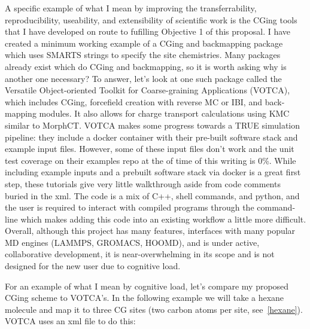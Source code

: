 A specific example of what I mean by improving the transferrability, reproducibility, useability, and extensibility of scientific work is the CGing tools that I have developed on route to fufilling Objective 1 of this proposal.
I have created a minimum working example of a CGing and backmapping package which uses SMARTS strings to specify the site chemistries\cite{grits}.
Many packages already exist which do CGing and backmapping, so it is worth asking why is another one necessary?
To answer, let's look at one such package called the Versatile Object-oriented Toolkit for Coarse-graining Applications (VOTCA)\cite{Ruhle2011b}, which includes CGing, forcefield creation with reverse MC or IBI, and back-mapping modules.
It also allows for charge transport calculations using KMC similar to MorphCT\cite{Lukyanov2010}.
VOTCA makes some progress towards a TRUE simulation pipeline: they include a docker container with their pre-built software stack and example input files.
However, some of these input files don't work and the unit test coverage on their examples repo at the of time of this writing is 0\%.
While including example inputs and a prebuilt software stack via docker is a great first step, these tutorials give very little walkthrough aside from code comments buried in the xml\cite{votca-github}.
The code is a mix of C++, shell commands, and python, and the user is required to interact with compiled programs through the command-line which makes adding this code into an existing workflow a little more difficult.
Overall, although this project has many features, interfaces with many popular MD engines (LAMMPS, GROMACS, HOOMD), and is under active, collaborative development, it is near-overwhelming in its scope and is not designed for the new user due to cognitive load.

For an example of what I mean by cognitive load, let's compare my proposed CGing scheme to VOTCA's.
In the following example we will take a hexane molecule and map it to three CG sites (two carbon atoms per site, see~\autoref{hexane}).
VOTCA uses an xml file to do this:




